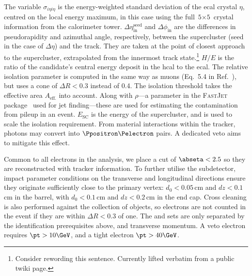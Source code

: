 The variable $\sigma_{i\eta i\eta}$ is the energy-weighted standard deviation of the \acrshort{ecal} crystal $\eta$, centred on the local energy maximum, in this case using the full $\text{5} \times \text{5}$ crystal information from the calorimeter tower. $\Delta\eta_{\mathrm{in}}^{\mathrm{seed}}$ and $\Delta\phi_{\mathrm{in}}$ are the differences in pseudorapidity and azimuthal angle, respectively, between the supercluster (seed in the case of $\Delta\eta$) and the track. They are taken at the point of closest approach to the supercluster, extrapolated from the innermost track state.\footnote{Consider rewording this sentence. Currently lifted verbatim from a public twiki page.} $H/E$ is the ratio of the candidate's central energy deposit in the \acrshort{hcal} to the \acrshort{ecal}. The relative isolation parameter is computed in the same way as muons (Eq.~5.4 in Ref.~\citenumNegSpace), but uses a cone of $\Delta R < \text{0.3}$ instead of 0.4. The isolation threshold takes the effective area $A_{\mathrm{eff.}}$ into account. Along with $\rho$---a parameter in the \textsc{FastJet} package~\cite{Cacciari:2011fastjet} used for \gls{jet} finding---these are used for estimating the contamination from pileup in an event. $E_{\mathrm{SC}}$ is the energy of the supercluster, and is used to scale the isolation requirement. From material interactions within the tracker, photons may convert into $\Ppositron\Pelectron$ pairs. A dedicated veto aims to mitigate this effect.

Common to all electrons in the analysis, we place a cut of $\abseta < \text{2.5}$ so they are reconstructed with tracker information. To further utilise the subdetector, impact parameter conditions on the transverse and longitudinal directions ensure they originate sufficiently close to the primary vertex: $d_0 < \text{0.05}$\,cm and $dz < \text{0.1}$\,cm in the barrel, with $d_0 < \text{0.1}$\,cm and $dz < \text{0.2}$\,cm in the end cap. Cross cleaning is also performed against the \looseMuon collection of objects, so electrons are not counted in the event if they are within $\Delta R < \text{0.3}$ of one. The \vetoEle and \tightEle sets are only separated by the identification prerequisites above, and transverse momentum. A veto electron requires $\pt > \text{10}\GeV$, and a tight electron $\pt > \text{40}\GeV$.


